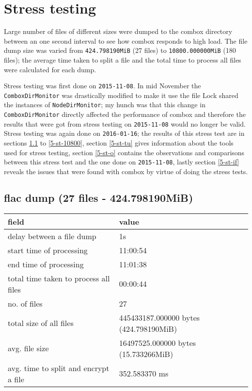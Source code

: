 \section{Stress testing}

Large number of files of different sizes were dumped to the combox
directory between an one second interval to see how combox responds to
high load. The file dump size was varied from \verb+424.798190MiB+ (27
files) to \verb+10800.000000MiB+ (180 files); the average time taken
to split a file and the total time to process all files were
calculated for each dump.

Stress testing was first done on \verb+2015-11-08+. In mid November
the \verb+ComboxDirMonitor+ was drastically modified to make it use
the file Lock shared the instances of
\verb+NodeDirMonitor+\cite{git:bug-eleven-fix}; my hunch was that this
change in \verb+ComboxDirMonitor+ directly affected the performance of
combox and therefore the results that were got from stress testing on
\verb+2015-11-08+ would no longer be valid. Stress testing was again
done on \verb+2016-01-16+; the results of this stress test are in
sections \ref{5-st-424} to \ref{5-st-10800}, section \ref{5-st-tu}
gives information about the tools used for stress testing, section
\ref{5-st-o} contains the observations and comparisons between this
stress test and the one done on \verb+2015-11-08+, lastly section
\ref{5-st-if} reveals the issues that were found with combox by virtue
of doing the stress tests.

\subsection{flac dump (27 files - 424.798190MiB)}\label{5-st-424}

\begin{center}
\begin{tabular}{ll}
field & value\\
\hline
delay between a file dump & 1s\\
start time of processing & 11:00:54\\
end time of processing & 11:01:38\\
total time taken to process all files & 00:00:44\\
no. of files & 27\\
total size of all files & 445433187.000000 bytes (424.798190MiB)\\
avg. file size & 16497525.000000 bytes (15.733266MiB)\\
avg. time to split and encrypt a file & 352.583370 ms\\
\end{tabular}
\end{center}

